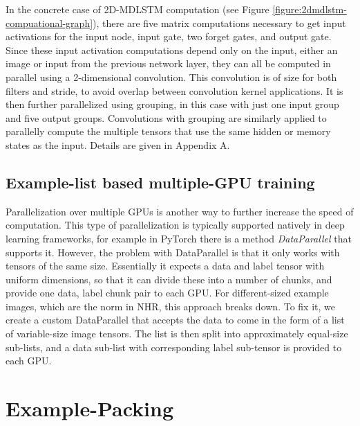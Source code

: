 \documentclass[conference]{IEEEtran}
\renewcommand{\ac}[1]{\gls{#1}}
\begin{document}
In the concrete case of 2D-\ac{MDLSTM} computation (see Figure \ref{figure:2dmdlstm-compuational-graph}), there are five matrix computations necessary to get input activations for the 
input node, input gate, two forget gates, and output gate. 
Since these input activation computations depend only on
the input, either an image or input from the previous network layer, they can all be computed in parallel using a 2-dimensional
convolution. This convolution is of size  for both filters and stride, to avoid overlap between convolution kernel applications.
It is then further parallelized using grouping, in this case with just one input group and five output groups.
Convolutions with grouping are similarly applied to parallelly compute the multiple tensors 
that use the same hidden or memory states as the input. Details are given in Appendix A.


\subsection{Example-list based multiple-GPU training}
Parallelization over multiple GPUs is another way to further increase the speed of computation.
This type of parallelization is typically supported natively in deep learning frameworks, for example 
in PyTorch there is a method \emph{DataParallel} that supports it. However, the problem with DataParallel 
is that it only works with tensors of the same size. Essentially it expects a data and label tensor 
with uniform dimensions, so that it can divide these into a number of chunks, and provide one data, label
chunk pair to each GPU. For different-sized example images, which are the norm in \ac{NHR}, this 
approach breaks down. To fix it, we create a custom DataParallel that accepts the data to come in the form of a list of 
variable-size image tensors. The list is then split into approximately equal-size sub-lists, and a data sub-list with 
corresponding label sub-tensor is provided to each GPU. 
 

\section{Example-Packing}
\label{section:example-packing}
\end{document}
